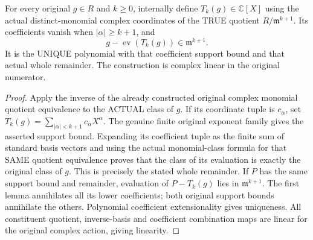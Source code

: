 \begin{theorem}
\label{hir:actual-original-canonical-finite-taylor-polynomial}
\leanok
For every original $g\in R$ and $k\ge0$, internally define
$T_k(g)\in\mathbb C[X]$ using the actual distinct-monomial complex
coordinates of the TRUE quotient $R/\mathfrak m^{k+1}$.
Its coefficients vanish when $|\alpha|\ge k+1$, and
\[
 g-\operatorname{ev}(T_k(g))\in\mathfrak m^{k+1}.
\]
It is the UNIQUE polynomial with that coefficient support bound and that
actual whole remainder. The construction is complex linear in the
original numerator.
\end{theorem}
\begin{proof}
Apply the inverse of the already constructed original complex monomial
quotient equivalence to the ACTUAL class of $g$. If its coordinate tuple
is $c_\alpha$, set $T_k(g)=\sum_{|\alpha|<k+1}c_\alpha X^\alpha$.
The genuine finite original exponent family gives the asserted support
bound. Expanding its coefficient tuple as the finite sum of standard
basis vectors and using the actual monomial-class formula for that SAME
quotient equivalence proves that the class of its evaluation is exactly
the original class of $g$. This is precisely the stated whole remainder.
If $P$ has the same support bound and remainder, evaluation of
$P-T_k(g)$ lies in $\mathfrak m^{k+1}$. The first lemma annihilates all
its lower coefficients; both original support bounds annihilate the
others. Polynomial coefficient extensionality gives uniqueness.
All constituent quotient, inverse-basis and coefficient combination maps
are linear for the original complex action, giving linearity.
\end{proof}

